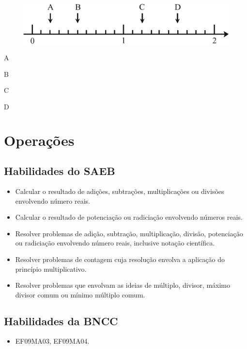 \begin{figure}[htpb!]
\centering
\includegraphics[width=\textwidth]{./ilustras-mat/modulo_1-treino_3.png}
\end{figure}

\begin{escolha}
  \item A
  \item B
  \item C
  \item D
\end{escolha}

\chapter{Operações}

\section*{Habilidades do SAEB}

\begin{itemize}
  \item Calcular o resultado de adições, subtrações, multiplicações ou divisões
envolvendo número reais.
  \item Calcular o resultado de potenciação ou radiciação envolvendo números
reais.
  \item Resolver problemas de adição, subtração, multiplicação, divisão,
potenciação ou radiciação envolvendo número reais, inclusive notação
científica.
  \item Resolver problemas de contagem cuja resolução envolva a aplicação do
princípio multiplicativo.
  \item Resolver problemas que envolvam as ideias de múltiplo, divisor, máximo
divisor comum ou mínimo múltiplo comum.  
\end{itemize} 

\section*{Habilidades da BNCC} 

\begin{itemize}
  \item EF09MA03, EF09MA04.
\end{itemize}

